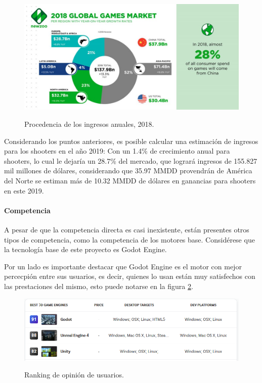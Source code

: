 \documentclass[]{article}
\begin{document}
\begin{figure}[H]
	
	\centering
	\includegraphics[width=1\textwidth]{GGM2}
	\caption{Procedencia de los ingresos anuales, 2018.  } \cite{Newzoo} 
	\label{ENWZOO2}
	
\end{figure}

Considerando los puntos anteriores, es posible calcular una estimaci\'on de ingresos para los shooters en el a\~no 2019:
Con un 1.4\% de crecimiento anual para shooters, lo cual le dejar\'ia un 28.7\% del mercado, que lograr\'a ingresos de 155.827 mil millones de d\'olares, considerando que 35.97 MMDD provendr\'an de Am\'erica del Norte se estiman m\'as de 10.32 MMDD de d\'olares en ganancias para shooters en este 2019. 
\paragraph{Competencia}
A pesar de que la competencia directa es casi inexistente, est\'an presentes otros tipos de competencia, como la competencia de los motores base. Consid\'erese que la tecnolog\'ia base de este proyecto es Godot Engine.

Por un lado es importante destacar que Godot Engine es el motor con mejor percecpi\'on entre sus usuarios, es decir, quienes lo usan est\'an muy satisfechos con las prestaciones del mismo, esto puede notarse en la figura \ref{SLANT2}.

\begin{figure}[H]
	
	\centering
	\includegraphics[width=1\textwidth]{Ranking}
	\caption{Ranking de opini\'on de usuarios.  } \cite{Slant} 
	\label{SLANT2}
	
\end{figure}
\end{document}
